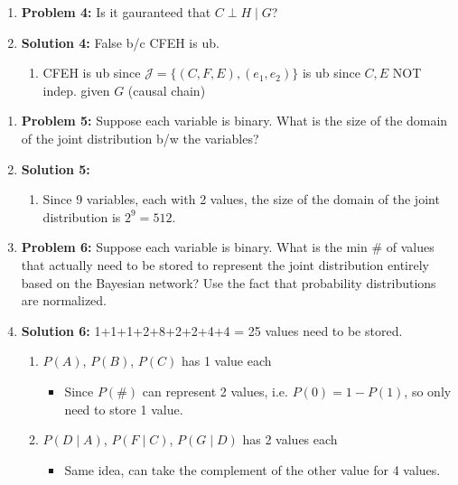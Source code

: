 \begin{example}
\begin{enumerate}
\begin{enumerate}
        \end{enumerate}
        \vspace{1em}
        \item \textbf{Problem 4:} Is it gauranteed that $C \perp H \mid G$?
        \item \textbf{Solution 4:} False b/c CFEH is ub.
        \begin{enumerate}
            \item CFEH is ub since $\mathcal{J} = \{(C,F,E),(e_1,e_2)\}$ is ub since $C,E$ NOT indep. given $G$ (causal chain)
        \end{enumerate}
    \end{enumerate}
\end{example}

\begin{example}
    \begin{enumerate}
        \item \textbf{Problem 5:} Suppose each variable is binary. What is the size of the domain of the joint distribution b/w the variables?
        \item \textbf{Solution 5:}
        \begin{enumerate}
            \item Since 9 variables, each with 2 values, the size of the domain of the joint distribution is $2^9 = 512$.
        \end{enumerate}
        \vspace{1em}
        \item \textbf{Problem 6:} Suppose each variable is binary. What is the min \# of values that actually need to be stored to represent the joint distribution entirely based on the Bayesian network? Use the fact that probability distributions are normalized.
        \item \textbf{Solution 6:} 1+1+1+2+8+2+2+4+4 = 25 values need to be stored.
        \begin{enumerate}
            \item $P(A)$, $P(B)$, $P(C)$ has 1 value each 
            \begin{itemize}
                \item Since $P(\#)$ can represent 2 values, i.e. $P(0) = 1-P(1)$, so only need to store 1 value.
            \end{itemize}
            \item $P(D \mid A)$, $P(F \mid C)$, $P(G \mid D)$ has 2 values each
            \begin{itemize}
                \item Same idea, can take the complement of the other value for 4 values.

\end{itemize}
\end{enumerate}
\end{enumerate}
\end{example}
